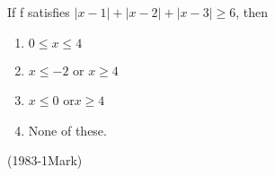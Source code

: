   \item If f satisfies $|x-1| + |x-2| + |x-3|\geq6$, then
  \begin{multicols}{2}
    \begin{enumerate}
        

      \item $0\leq x\leq4$
      
      \item $x \leq-2$ or $x\geq4$
      
      \item $x\leq0$ or$x\geq4$
      
      \item None of these.

    \end{enumerate}
  \end{multicols}
  \hfill
  (1983-1Mark)

